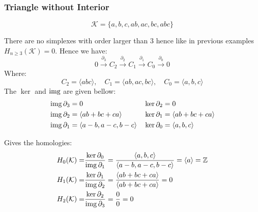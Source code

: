 \subsubsection{Triangle without Interior}
\begin{center}
\end{center}
\[\mathcal{K}=\{a,b,c,ab,ac,bc,abc\}\]

There are no simplexes with order larger than $3$ hence like in previous examples $H_{n\geq 3}(\mathcal{K}) = 0$.
Hence we have:
\[0 \stackrel{\partial_3}{\longrightarrow} C_2 \stackrel{\partial_2}{\longrightarrow} C_1 \stackrel{\partial_1}{\longrightarrow} C_0 \stackrel{\partial_0}{\longrightarrow} 0\]
Where:
\[C_2 = \langle abc \rangle,\quad C_1 = \langle ab,ac,bc \rangle,\quad C_0 = \langle a,b,c \rangle\]
The $\ker$ and $\operatorname{img}$ are given bellow:
\begin{equation*}
\begin{aligned}
	&\operatorname{img} \partial_3 = 0 && \ker \partial_2 = 0\\
	&\operatorname{img} \partial_2 = \langle ab+bc+ca\rangle && \ker \partial_1 = \langle ab+bc+ca\rangle\\
	&\operatorname{img} \partial_1 = \langle a-b,a-c,b-c\rangle && \ker \partial_0 = \langle a,b,c\rangle\\
\end{aligned}
\end{equation*}

Gives the homologies:
\begin{equation*}
\begin{aligned}
	H_0(\mathcal{K}) =& \frac{\ker\partial_0}{\operatorname{img}\partial_1} = \frac{\langle a,b,c\rangle}{\langle a-b,a-c,b-c\rangle} = \langle a\rangle = \mathbb{Z}\\
	H_1(\mathcal{K}) =& \frac{\ker\partial_1}{\operatorname{img}\partial_2} = \frac{\langle ab+bc+ca\rangle}{\langle ab+bc+ca\rangle} = 0\\
	H_2(\mathcal{K}) =& \frac{\ker\partial_2}{\operatorname{img}\partial_3} = \frac{0}{0} = 0\\
\end{aligned}
\end{equation*}

